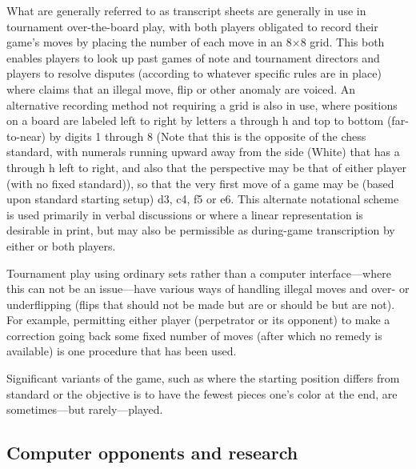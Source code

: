 \documentclass[a4paper]{report}
\begin{document}
\par
What are generally referred to as transcript sheets are generally in use in tournament over-the-board play, with both players obligated to record their game's moves by placing the number of each move in an 8×8 grid. This both enables players to look up past games of note and tournament directors and players to resolve disputes (according to whatever specific rules are in place) where claims that an illegal move, flip or other anomaly are voiced. An alternative recording method not requiring a grid is also in use, where positions on a board are labeled left to right by letters a through h and top to bottom (far-to-near) by digits 1 through 8 (Note that this is the opposite of the chess standard, with numerals running upward away from the side (White) that has a through h left to right, and also that the perspective may be that of either player (with no fixed standard)), so that the very first move of a game may be (based upon standard starting setup) d3, c4, f5 or e6. This alternate notational scheme is used primarily in verbal discussions or where a linear representation is desirable in print, but may also be permissible as during-game transcription by either or both players. 
\par
Tournament play using ordinary sets rather than a computer interface—where this can not be an issue—have various ways of handling illegal moves and over- or underflipping (flips that should not be made but are or should be but are not). For example, permitting either player (perpetrator or its opponent) to make a correction going back some fixed number of moves (after which no remedy is available) is one procedure that has been used. 
\par
Significant variants of the game, such as where the starting position differs from standard or the objective is to have the fewest pieces one's color at the end, are sometimes—but rarely—played. 
\subsection{Computer opponents and research}
\end{document}
